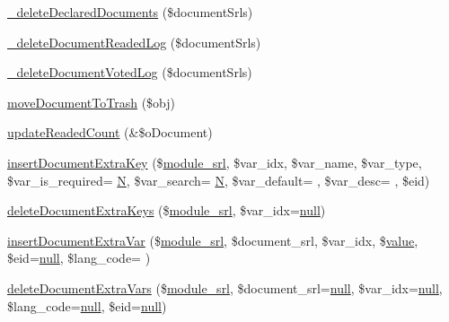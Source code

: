 \begin{DoxyCompactItemize}
\item 
\hyperlink{classdocumentController_a2514acfe313b7ddd5daccb50557d38b5}{\+\_\+delete\+Declared\+Documents} (\$document\+Srls)
\item 
\hyperlink{classdocumentController_ac055fa2cc48de200d0b319eddd7a13da}{\+\_\+delete\+Document\+Readed\+Log} (\$document\+Srls)
\item 
\hyperlink{classdocumentController_a9fe391d1b1ece3b7b16d15976c1622d0}{\+\_\+delete\+Document\+Voted\+Log} (\$document\+Srls)
\item 
\hyperlink{classdocumentController_a3f861f8df6113ca3211c48be3c49f305}{move\+Document\+To\+Trash} (\$obj)
\item 
\hyperlink{classdocumentController_a437461a6588e59e038ed54316bfa7893}{update\+Readed\+Count} (\&\$o\+Document)
\item 
\hyperlink{classdocumentController_a832207dfbf4dac2f32d4a365f9e5ea77}{insert\+Document\+Extra\+Key} (\$\hyperlink{ko_8install_8php_a370bb6450fab1da3e0ed9f484a38b761}{module\+\_\+srl}, \$var\+\_\+idx, \$var\+\_\+name, \$var\+\_\+type, \$var\+\_\+is\+\_\+required= \textquotesingle{}\hyperlink{jquery-1_8x_8min_8js_ab8a5cba0bbaa18ec7f830663874cb9d0}{N}\textquotesingle{}, \$var\+\_\+search= \textquotesingle{}\hyperlink{jquery-1_8x_8min_8js_ab8a5cba0bbaa18ec7f830663874cb9d0}{N}\textquotesingle{}, \$var\+\_\+default= \textquotesingle{}\textquotesingle{}, \$var\+\_\+desc= \textquotesingle{}\textquotesingle{}, \$eid)
\item 
\hyperlink{classdocumentController_a279894a3cef824bc940cda67ced511aa}{delete\+Document\+Extra\+Keys} (\$\hyperlink{ko_8install_8php_a370bb6450fab1da3e0ed9f484a38b761}{module\+\_\+srl}, \$var\+\_\+idx=\hyperlink{modernizr_8min_8js_a286f9ec831c5e676eeb493248eab9575}{null})
\item 
\hyperlink{classdocumentController_adb5345b43e9795d7e647754cb88b9b5a}{insert\+Document\+Extra\+Var} (\$\hyperlink{ko_8install_8php_a370bb6450fab1da3e0ed9f484a38b761}{module\+\_\+srl}, \$document\+\_\+srl, \$var\+\_\+idx, \$\hyperlink{common_2js_2jquery_8js_abe5393d870043cf6aaa1d5ad5fce755c}{value}, \$eid=\hyperlink{modernizr_8min_8js_a286f9ec831c5e676eeb493248eab9575}{null}, \$lang\+\_\+code= \textquotesingle{}\textquotesingle{})
\item 
\hyperlink{classdocumentController_a1ebb5684cf99ea4044fa476c6d006bd2}{delete\+Document\+Extra\+Vars} (\$\hyperlink{ko_8install_8php_a370bb6450fab1da3e0ed9f484a38b761}{module\+\_\+srl}, \$document\+\_\+srl=\hyperlink{modernizr_8min_8js_a286f9ec831c5e676eeb493248eab9575}{null}, \$var\+\_\+idx=\hyperlink{modernizr_8min_8js_a286f9ec831c5e676eeb493248eab9575}{null}, \$lang\+\_\+code=\hyperlink{modernizr_8min_8js_a286f9ec831c5e676eeb493248eab9575}{null}, \$eid=\hyperlink{modernizr_8min_8js_a286f9ec831c5e676eeb493248eab9575}{null})

\end{DoxyCompactItemize}
